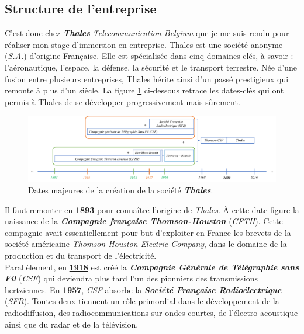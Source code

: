 \documentclass[10pt, oneside, a4paper]{article}
\begin{document}
\subsection{Structure de l'entreprise}
C'est donc chez \textbf{\textit{Thales}} \textit{Telecommunication Belgium} que je me suis rendu pour réaliser mon stage d'immersion en entreprise. Thales est une société anonyme (\textit{S.A.}) d'origine Française. Elle est spécialisée dans cinq domaines clés, à savoir : l'aéronautique, l'espace, la défense, la sécurité et le transport terrestre. Née d'une fusion entre plusieurs entreprises, Thales hérite ainsi d’un passé prestigieux qui remonte à plus d’un siècle. La figure \ref{fig:temps} ci-dessous retrace les dates-clés qui ont permis à Thales de se développer progressivement mais sûrement. \\

\begin{figure}[htbp]
    \centering
    \includegraphics[width=1.10\textwidth]{image/temps}
    \caption{Dates majeures de la création de la société \textbf{\textit{Thales}}.}
    \label{fig:temps}
\end{figure}

Il faut remonter en \underline{\textbf{1893}} pour connaître l'origine de \textit{Thales}. À cette date figure la naissance de la \textbf{\textit{Compagnie française Thomson-Houston}} (\textit{CFTH}). Cette compagnie avait essentiellement pour but d'exploiter en France les brevets de la société américaine \textit{Thomson-Houston Electric Company}, dans le domaine de la production et du transport de l'électricité. \\

Parallèlement, en \underline{\textbf{1918}} est créé la \textbf{\textit{Compagnie Générale de Télégraphie sans Fil}} (\textit{CSF}) qui deviendra plus tard l'un des pionniers des transmissions hertziennes. En \underline{\textbf{1957}}, \textit{CSF} absorbe la \textbf{\textit{Société Française Radioélectrique}} (\textit{SFR}). Toutes deux tiennent un rôle primordial dans le développement de la radiodiffusion, des radiocommunications sur ondes courtes, de l'électro-acoustique ainsi que du radar et de la télévision. \\
\end{document}
